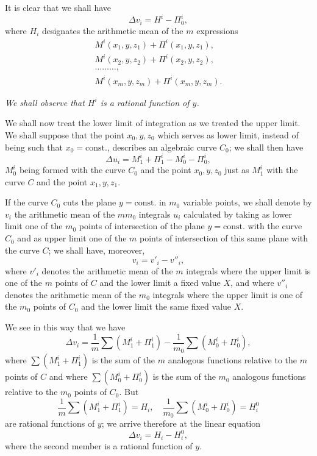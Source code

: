 \documentclass{article}
\begin{document}
It is clear that we shall have
\[
\Delta v_{i} = H^{i} - \Pi_{0}^{i}, \tag{5 d}
\]
where $H_{i}$ designates the arithmetic mean of the $m$ expressions
\[
\begin{gathered}
M^{i}(x_{1}, y, z_{1}) + \Pi^{i}(x_{1}, y, z_{1}), \\
M^{i}(x_{2}, y, z_{2}) + \Pi^{i}(x_{2}, y, z_{2}), \\
\dots\ldots\dots, \\
M^{i}(x_{m}, y, z_{m}) + \Pi^{i}(x_{m}, y, z_{m}).
\end{gathered}
\]

\emph{We shall observe that $H^{i}$ is a rational function of $y$.}

We shall now treat the lower limit of integration as we treated the upper limit. We shall suppose that the point $x_{0}, y, z_{0}$ which serves as lower limit, instead of being such that $x_{0} = \text{const.}$, describes an algebraic curve $C_{0}$; we shall then have
\[
\Delta u_{i} = M_{1}^{i} + \Pi_{1}^{i} - M_{0}^{i} - \Pi_{0}^{i},
\]
$M_{0}^{i}$ being formed with the curve $C_{0}$ and the point $x_{0}, y, z_{0}$ just as $M_{1}^{i}$ with the curve $C$ and the point $x_{1}, y, z_{1}$.

If the curve $C_{0}$ cuts the plane $y = \text{const.}$ in $m_{0}$ variable points, we shall denote by $v_{i}$ the arithmetic mean of the $m m_{0}$ integrals $u_{i}$ calculated by taking as lower limit one of the $m_{0}$ points of intersection of the plane $y = \text{const.}$ with the curve $C_{0}$ and as upper limit one of the $m$ points of intersection of this same plane with the curve $C$; we shall have, moreover,
\[
v_{i} = v'_{i} - v''_{i},
\]
where $v'_{i}$ denotes the arithmetic mean of the $m$ integrals where the upper limit is one of the $m$ points of $C$ and the lower limit a fixed value $X$, and where $v''_{i}$ denotes the arithmetic mean of the $m_{0}$ integrals where the upper limit is one of the $m_{0}$ points of $C_{0}$ and the lower limit the same fixed value $X$.

We see in this way that we have
\[
\Delta v_{i} = \frac{1}{m} \sum (M_{1}^{i} + \Pi_{1}^{i}) - \frac{1}{m_{0}} \sum (M_{0}^{i} + \Pi_{0}^{i}),
\]
where $\displaystyle\sum (M_{1}^{i} + \Pi_{1}^{i})$ is the sum of the $m$ analogous functions relative to the $m$ points of $C$ and where $\displaystyle\sum (M_{0}^{i} + \Pi_{0}^{i})$ is the sum of the $m_{0}$ analogous functions relative to the $m_{0}$ points of $C_{0}$. But
\[
\frac{1}{m} \sum (M_{1}^{i} + \Pi_{1}^{i}) = H_{i}, \quad \frac{1}{m_{0}} \sum (M_{0}^{i} + \Pi_{0}^{i}) = H_{i}^{0}
\]
are rational functions of $y$; we arrive therefore at the linear equation
\[
\Delta v_{i} = H_{i} - H_{i}^{0}, \tag{5 e}
\]
where the second member is a rational function of $y$.
\end{document}
